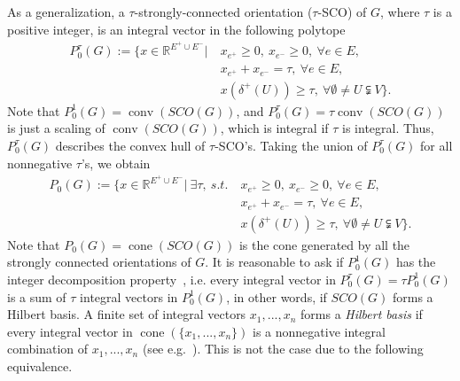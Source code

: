 \documentclass[runningheads]{llncs}
\DeclareMathOperator{\conv}{conv}
\DeclareMathOperator{\cone}{cone}
\begin{document}
    As a generalization, a $\tau$-strongly-connected orientation ($\tau$-SCO) of $G$, where $\tau$ is a positive integer, is an integral vector in the following polytope
    \begin{equation}\label{eq:def_P0^tau}
    \begin{aligned}
        P_0^\tau(G):=\big\{x\in\mathbb{R}^{E^+\cup E^-}\big|~&x_{e^+}\geq 0,~ x_{e^-}\geq 0, ~\forall e\in E,\\
        &x_{e^+}+x_{e^-}=\tau,~\forall e\in E,\\
        &x(\delta^+(U))\geq \tau,~ \forall \emptyset \neq U\subsetneqq V\big\}.
    \end{aligned}
    \end{equation}
    Note that $P_0^1(G)=\conv(SCO(G))$, and $P_0^\tau(G)=\tau\conv(SCO(G))$ is just a scaling of $\conv(SCO(G))$, which is integral if $\tau$ is integral. Thus, $P_0^\tau(G)$ describes the convex hull of $\tau$-SCO's. Taking the union of $P_0^\tau(G)$ for all nonnegative $\tau$'s, we obtain
    \begin{equation}
    \begin{aligned}
        P_0(G):=\big\{x\in\mathbb{R}^{E^+\cup E^-}\big|~\exists \tau, ~s.t. ~&x_{e^+}\geq 0,~ x_{e^-}\geq 0, ~\forall e\in E,\\
        &x_{e^+}+x_{e^-}=\tau,~\forall e\in E,\\
        &x(\delta^+(U))\geq \tau,~ \forall \emptyset \neq U\subsetneqq V\big\}.
    \end{aligned}
    \end{equation}
Note that $P_0(G)=\cone(SCO(G))$ is the cone generated by all the strongly connected orientations of $G$. It is reasonable to ask if $P_0^1(G)$ has the integer decomposition property~\cite{baum1978integer}, i.e. every integral vector in $P_0^\tau(G)=\tau P_0^1(G)$ is a sum of $\tau$ integral vectors in $P_0^1(G)$, in other words, if $SCO(G)$ forms a Hilbert basis. A finite set of integral vectors $x_1,...,x_n$ forms a \textit{Hilbert basis} if every integral vector in $\cone(\{x_1,...,x_n\})$ is a nonnegative integral combination of $x_1,...,x_n$ (see e.g.~\cite{schrijver1998theory}). This is not the case due to the following equivalence.
\end{document}
